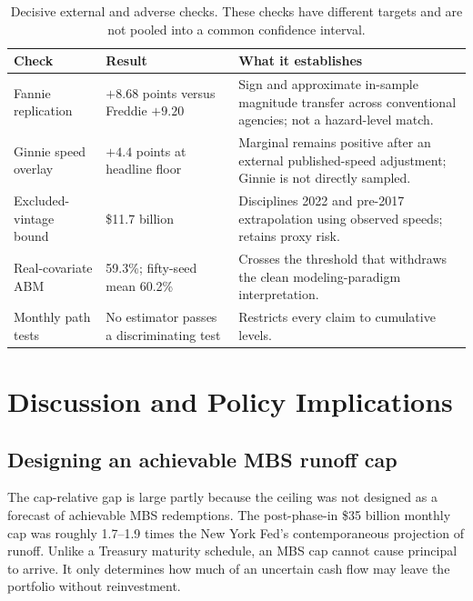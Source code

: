 \begin{table}[H]
\centering
\small
\caption{Decisive external and adverse checks. These checks have different targets and are not pooled into a common confidence interval.}
\label{tab:validation}\label{tab:crossdesign}\label{tab:wal}
\begin{tabular}{@{}p{4.0cm}p{4.0cm}p{6.5cm}@{}}
\toprule
Check & Result & What it establishes \\
\midrule
Fannie replication & $+8.68$ points versus Freddie $+9.20$ & Sign and approximate in-sample magnitude transfer across conventional agencies; not a hazard-level match. \\
Ginnie speed overlay & $+4.4$ points at headline floor & Marginal remains positive after an external published-speed adjustment; Ginnie is not directly sampled. \\
Excluded-vintage bound & \$11.7 billion & Disciplines 2022 and pre-2017 extrapolation using observed speeds; retains proxy risk. \\
Real-covariate ABM & 59.3\%; fifty-seed mean 60.2\% & Crosses the threshold that withdraws the clean modeling-paradigm interpretation. \\
Monthly path tests & No estimator passes a discriminating test & Restricts every claim to cumulative levels. \\
\bottomrule
\end{tabular}
\end{table}

\section{Discussion and Policy Implications}\label{sec:policy}\label{sec:discussion}\label{sec:discussion-fallout}\label{sec:discussion-capdesign}\label{sec:discussion-policy}\label{sec:abm-danish}\label{tab:danish}

\subsection{Designing an achievable MBS runoff cap}

The cap-relative gap is large partly because the ceiling was not designed as a forecast of achievable MBS redemptions. The post-phase-in \$35 billion monthly cap was roughly 1.7--1.9 times the New York Fed's contemporaneous projection of runoff. Unlike a Treasury maturity schedule, an MBS cap cannot cause principal to arrive. It only determines how much of an uncertain cash flow may leave the portfolio without reinvestment.

